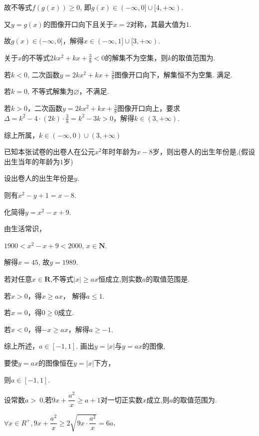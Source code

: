 \documentclass[cs4size,windows,a4paper,answers]{BHCexam}
\begin{document}
\begin{groups}
\begin{questions}[]
\begin{solution}
故不等式$f(g(x))\ge0$, 即$g(x)\in(-\infty,0]\cup[4,+\infty)$.

又$y=g(x)$的图像开口向下且关于$x=2$对称，其最大值为$1$.

故$g(x)\in(-\infty,0]$，解得$x\in(-\infty,1]\cup[3,+\infty)$.

\end{solution}
\question[4] 关于$x$的不等式$2kx^2+kx+\frac{3}{8}<0$的解集不为空集，则$k$的取值范围为.
\begin{solution}
\methodonly
若$k \lt 0 $, 二次函数$y=2kx^2+kx+\frac{3}{8}$图像开口向下，解集恒不为空集. 满足.

若$k=0$, 不等式解集为$\varnothing$，不满足.

若$k>0$，二次函数$y=2kx^2+kx+\frac{3}{8}$图像开口向上，要求$\Delta=k^2-4 \cdot (2k) \cdot \frac{3}{8}=k^2-3k \gt 0$，解得$k\in(3,+\infty)$.

综上所属，$k \in (-\infty,0)\cup(3,+\infty)$



\end{solution}
\question[4] 已知本张试卷的出卷人在公元$x^2$年时年龄为$x-8$岁，则出卷人的出生年份是.(假设出生当年的年龄为$1$岁)
\begin{solution}
\methodonly
设出卷人的出生年份是$y$.

则有$x^2-y+1=x-8$.

化简得$y=x^2-x+9$.

由生活常识，

$1900<x^2-x+9<2000$, $x\in\mathbf{N}$.

解得$x=45$, 故$y=1989$.



\end{solution}
\question[5] 若对任意$x\in\mathbf{R}$,不等式$|x|\geqslant{}ax$恒成立,则实数$a$的取值范围是.
\begin{solution}
\method
若$x \gt 0$，得$x \ge ax$， 解得$a \le 1$.

若$x = 0$，得$0 \ge 0$成立.

若$x \lt 0$，得$-x \ge ax$，解得$a \ge -1$.

综上所述，$a \in [-1,1]$.
\method
画出$y=|x|$与$y=ax$的图像, 

要使$y=ax$的图像恒在$y=|x|$下方，

则$a\in[-1,1]$.

\end{solution}
\question[5] 设常数$a\gt\ 0$,若$9x+\dfrac{a^2}{x}\geqslant{}a+1$对一切正实数$x$成立,则$a$的取值范围为\mtk{$\left[\dfrac{1}{5}, + \infty \right)$}.
\begin{solution}
\methodonly
$\forall x\in{R}^{+},9x+\dfrac{a^2}{x}\geqslant{}2\sqrt{9x\cdot{}\dfrac{a^2}{x}}=6a$,


\end{solution}
\end{questions}
\end{groups}
\end{document}
